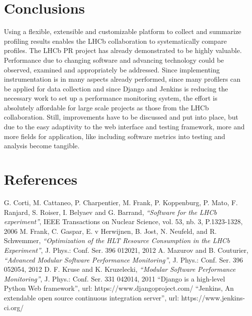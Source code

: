 \documentclass[a4paper]{jpconf}
\begin{document}
\section{Conclusions}
\label{sec:conclusions}

Using a flexible, extensible and customizable platform to collect and summarize profiling results enables the LHCb collaboration to systematically compare profiles. The LHCb PR project has already demonstrated to be highly valuable. Performance due to changing software and advancing technology could be observed, examined and appropriately be addressed. Since implementing instrumentation is in many aspects already performed, since many profilers can be applied for data collection and since Django and Jenkins is reducing the necessary work to set up a performance monitoring system, the effort is absolutely affordable for large scale projects as those from the LHCb collaboration. Still, improvements have to be discussed and put into place, but due to the easy adaptivity to the web interface and testing framework, more and more fields for application, like including software metrics into testing and analysis become tangible. 

\section*{References}

\begin{thebibliography}{3}
 G. Corti, M. Cattaneo, P. Charpentier, M. Frank, P. Koppenburg, P. Mato, F. Ranjard, S. Roiser, I. Belyaev and G. Barrand, {\it ``Software for the LHCb experiment''}, IEEE Transactions on Nuclear Science, vol. 53, nb. 3, P.1323-1328, 2006
M. Frank, C. Gaspar, E. v Herwijnen, B. Jost, N. Neufeld, and R. Schwemmer, {\it ``Optimization of the HLT Resource Consumption in the LHCb Experiment''}, J. Phys.: Conf. Ser. 396 012021, 2012
 A. Mazurov and B. Couturier, {\it ``Advanced Modular Software Performance Monitoring''}, J. Phys.: Conf. Ser. 396 052054, 2012
 D. F. Kruse and K. Kruzelecki, {\it ``Modular Software Performance Monitoring''}, J. Phys.: Conf. Ser. 331 042014, 2011
 ``Django is a high-level Python Web framework'', url: https://www.djangoproject.com/
 ``Jenkins, An extendable open source continuous integration server'', url: https://www.jenkins-ci.org/
\end{thebibliography}
\end{document}
